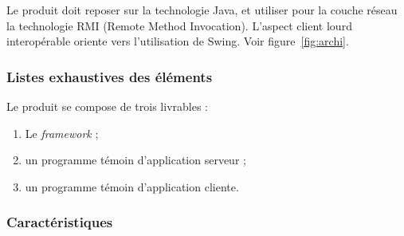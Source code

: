 Le produit doit reposer sur la technologie Java, et utiliser pour la couche réseau la technologie RMI (Remote Method Invocation). L'aspect client lourd interopérable oriente vers l'utilisation de Swing. Voir figure~\ref{fig:archi}.

\subsubsection{Listes exhaustives des éléments}

Le produit se compose de trois livrables :
\begin{enumerate}
 \item Le \textit{framework} ;
 \item un programme témoin d'application serveur ;
 \item un programme témoin d'application cliente.
\end{enumerate}

\subsubsection{Caractéristiques}

